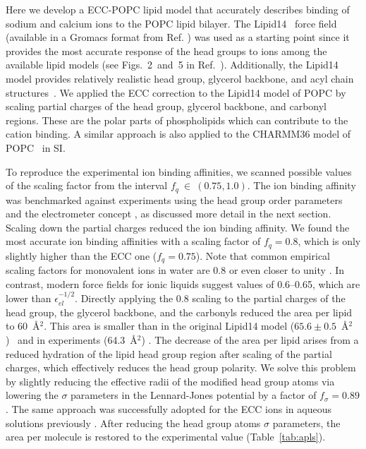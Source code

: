 \documentclass[journal=jpcbfk,manuscript=article]{achemso}
\begin{document}
Here we develop a ECC-POPC lipid model that accurately describes binding 
of sodium and calcium ions to the POPC  lipid bilayer. 
The Lipid14~\cite{dickson14} force field 
(available in a Gromacs format from Ref. ) was used as a starting 
point since 
it provides the most accurate response of the head groups to ions among the available 
lipid models (see Figs.~2~and~5 in Ref.~). Additionally, the Lipid14 model 
provides relatively realistic head group, glycerol backbone, and acyl chain structures~\cite{dickson14,botan15}.
We applied the ECC correction 
to the Lipid14 model of POPC by scaling 
partial charges of the head group, glycerol 
backbone, and carbonyl regions. 
These are the polar parts of phospholipids which can 
contribute to the cation binding.
A similar approach is also applied to the CHARMM36 model of POPC~\cite{klauda10} in SI.

To reproduce the experimental ion binding affinities,
we scanned possible values of the scaling factor from the interval $f_q~\in~(0.75, 1.0)$.
The ion binding affinity was benchmarked against experiments
using the head group order parameters and the electrometer concept \cite{seelig87,catte16},
as discussed more detail in the next section.
Scaling down the partial charges reduced the ion binding affinity.
We found the most accurate ion binding affinities with a scaling factor of $f_q = 0.8$,
which is only slightly higher than the ECC one ($f_q=0.75$).
Note that common empirical scaling factors for monovalent ions in water are 0.8 or
even closer to unity \cite{benavides17,skinner14,nacleps}.  In contrast, modern force fields
for ionic liquids suggest values of 0.6--0.65, which are lower than $\epsilon^{-1/2}_{el}$\cite{holm14}.
Directly applying
the 0.8 scaling to the partial charges of the head group, the glycerol backbone, and
the carbonyls reduced the area per lipid to 60~\AA$^2$. This area is smaller than in the
original Lipid14 model ($65.6 \pm 0.5$~\AA$^2$)~\cite{dickson14} and in experiments
(64.3~\AA$^2$) \cite{kucerka11}. The decrease of the area per lipid arises from a
reduced hydration of the lipid head group region after scaling of the partial charges, which effectively
reduces the head group polarity. We solve this problem by slightly reducing the effective radii of
the modified head group atoms via lowering the $\sigma$ parameters in the Lennard-Jones potential by a
factor of $f_\sigma = 0.89$. The same approach was successfully adopted for the ECC ions in aqueous
solutions previously \cite{kohagen14, kohagen16, Pluharova2014, martinek17}. After reducing the head group atoms $\sigma$ parameters, the area per molecule is restored to the experimental value (Table~\ref{tab:apls}). 
\end{document}
